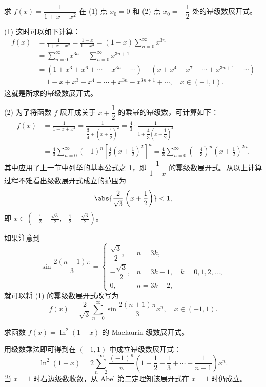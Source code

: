 \begin{xexample}[14.4.3]
求 $f(x)=\dfrac1{1+x+x^2}$ 在 (1) 点 $x_0=0$ 和 (2) 点 $x_0=-\dfrac12$ 处的幂级数展开式。
\end{xexample}
\begin{xsolution}
(1) 这时可以如下计算：
\[
\begin{aligned}
  f(x)&=\frac1{1+x+x^2}=\frac{1-x}{1-x^3}=(1-x)\sum_{n=0}^{\infty}x^{3n}\\
  &=\sum_{n=0}^{\infty}x^{3n}-\sum_{n=0}^{\infty}x^{3n+1}\\
  &=(1+x^3+x^6+\cdots+x^{3n}+\cdots)-(x+x^4+x^7+\cdots+x^{3n+1}+\cdots)\\
  &=1-x+x^3-x^4+\cdots+x^{3n}-x^{3n+1}+\cdots,\quad x\in(-1,1).
\end{aligned}
\]
这就是所求的幂级数展开式。

(2) 为了将函数 $f$ 展开成关于 $x+\dfrac12$ 的乘幂的幂级数，可计算如下：
\[
\begin{aligned}
  f(x)&=\frac1{1+x+x^2}=\frac1{\dfrac34+\left(x+\dfrac12\right)^2}=\frac43\cdot\frac1{1+\dfrac43\left(x+\dfrac12\right)^2}\\
  &=\frac43\sum_{n=0}^{\infty}(-1)^n\left[\frac43\left(x+\frac12\right)^2\right]^n
  =\frac43\sum_{n=0}^{\infty}\left(-\frac43\right)^n\left(x+\frac12\right)^{2n}.
\end{aligned}
\]
其中应用了上一节中列举的基本公式之 1，即 $\dfrac1{1-x}$ 的幂级数展开式。从以上计算过程不难看出级数展开式成立的范围为
\[
  \abs{\frac2{\sqrt3}\left(x+\frac12\right)}<1,
\]
即 $\displaystyle x\in\left(-\frac12-\frac{\sqrt3}{2},-\frac12+\frac{\sqrt3}{2}\right)$。
\end{xsolution}

\begin{xremark}
如果注意到
\[
  \sin\frac{2(n+1)\pi}{3}=
  \begin{cases}
    \dfrac{\sqrt3}{2},&n=3k,\\[3pt]
    -\dfrac{\sqrt3}{2},&n=3k+1,\quad k=0,1,2,\ldots,\\[3pt]
    0,&n=3k+2,
  \end{cases}
\]
就可以将 (1) 的幂级数展开式改写为
\[
  f(x)=\frac2{\sqrt3}\sum_{n=0}^{\infty}\sin\frac{2(n+1)\pi}{3}x^n,\quad x\in(-1,1).
\]
\end{xremark}

\begin{xexample}[14.4.4]
求函数 $f(x)=\ln^2(1+x)$ 的 Maclaurin 级数展开式。
\end{xexample}
\begin{xsolution}
用级数乘法即可得到在 $(-1,1)$ 中成立幂级数展开式：
\begin{equation}
  \ln^2(1+x)=2\sum_{n=2}^{\infty}\frac{(-1)^n}{n}\left(1+\frac12+\frac13+\cdots+\frac1{n-1}\right)x^n.
  \tag{14.29}
  \label{eq:14.29}
\end{equation}
当 $x=1$ 时右边级数收敛，从 Abel 第二定理知该展开式在 $x=1$ 时仍成立。
\end{xsolution}

